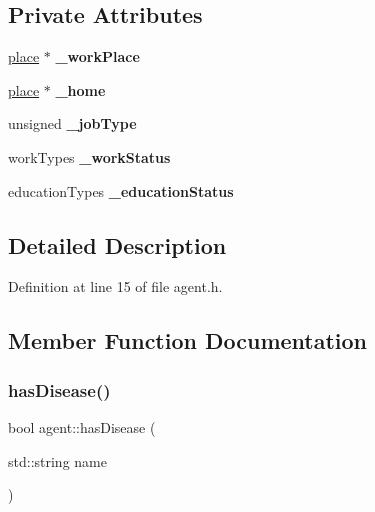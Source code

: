 \subsection*{Private Attributes}
\begin{DoxyCompactItemize}
\item 
\mbox{\label{classagent_a232bde3d6f75bac6c1fba313b7124b13}} 
\mbox{\hyperlink{classplace}{place}} $\ast$ {\bfseries \+\_\+work\+Place}
\item 
\mbox{\label{classagent_a6db9c370528e73527b4d7a8b00ffab23}} 
\mbox{\hyperlink{classplace}{place}} $\ast$ {\bfseries \+\_\+home}
\item 
\mbox{\label{classagent_a4155df9fba51d2a5387b266e74f0703e}} 
unsigned {\bfseries \+\_\+job\+Type}
\item 
\mbox{\label{classagent_a79ee05496cc1bc2d806fbb70a45d9f99}} 
work\+Types {\bfseries \+\_\+work\+Status}
\item 
\mbox{\label{classagent_abbfd4798d2b47e4b418a9aefa75fd75b}} 
education\+Types {\bfseries \+\_\+education\+Status}
\end{DoxyCompactItemize}


\subsection{Detailed Description}


Definition at line 15 of file agent.\+h.



\subsection{Member Function Documentation}
\mbox{\label{classagent_aab67fe9df4777af3690138fa97d0a3a1}} 
\subsubsection{\texorpdfstring{has\+Disease()}{hasDisease()}}
{\footnotesize\ttfamily bool agent\+::has\+Disease (\begin{DoxyParamCaption}\item[{std\+::string}]{name }\end{DoxyParamCaption})}




